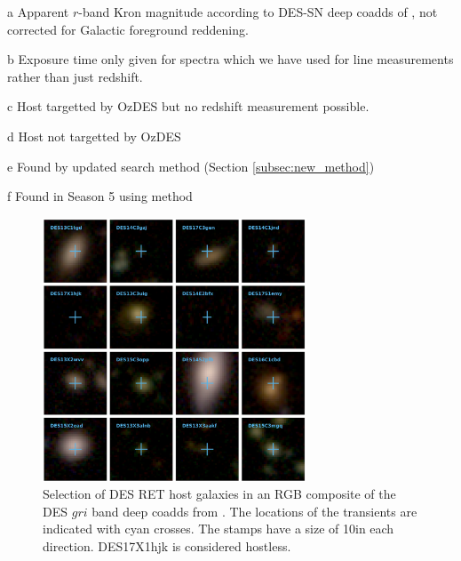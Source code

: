 \documentclass[fleqn,usenatbib,]{mnras}
\newcommand{\replylluis}[1]{\color{brown}#1 \color{black}}
\begin{document}
\begin{table}
\begin{threeparttable}
\begin{tabular}{llllllll}
\bottomrule
\end{tabular}
\begin{tablenotes}
\item[a] Apparent $r$-band Kron magnitude according to DES-SN deep coadds of \citet{Wiseman2020}, not corrected for Galactic foreground reddening.
\item[b] Exposure time only given for spectra which we have used for line measurements rather than just redshift.
\item[c] Host targetted by OzDES but no redshift measurement possible.
\item[d] Host not targetted by OzDES
\item[e] Found by updated search method (Section \ref{subsec:new_method})
\item[f] Found in Season 5 using  method 
\end{tablenotes}
\end{threeparttable}
\label{tab:obs}
\end{table}

\begin{figure}
\includegraphics[width=0.7\textwidth]{figs/RET_Mosaic.png}
\caption{Selection of DES RET host galaxies in an RGB composite of the DES $gri$ band deep coadds from \citet{Wiseman2020}. The locations of the transients are indicated with cyan crosses. The stamps have a size of 10\arcsec in each direction. \replylluis{DES17X1hjk is considered hostless.}
\label{fig:mosaic}}
\end{figure}
\end{document}
